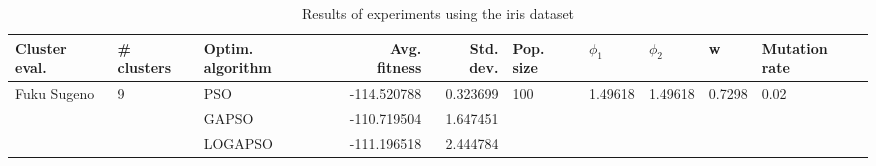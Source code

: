 \begin{table}
\centering
\caption{Results of experiments using the iris dataset}
\begin{tabular}{lllrrlllll}
\toprule
               Cluster eval. &        \# clusters & Optim. algorithm &  Avg. fitness &  Std. dev. &            Pop. size &               $\phi_{1}$ &               $\phi_{2}$ &                       w &         Mutation rate \\
\midrule
\multirow{3}{*}{Fuku Sugeno} & \multirow{3}{*}{9} &              PSO &   -114.520788 &   0.323699 & \multirow{3}{*}{100} & \multirow{3}{*}{1.49618} & \multirow{3}{*}{1.49618} & \multirow{3}{*}{0.7298} & \multirow{3}{*}{0.02} \\
                             &                    &            GAPSO &   -110.719504 &   1.647451 &                      &                          &                          &                         &                       \\
                             &                    &          LOGAPSO &   -111.196518 &   2.444784 &                      &                          &                          &                         &                       \\
\bottomrule
\end{tabular}
\end{table}
